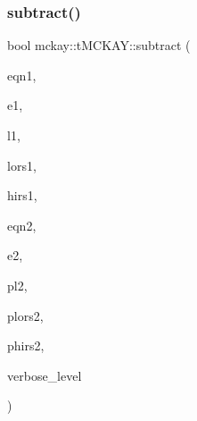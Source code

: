 \mbox{\label{classmckay_1_1t_m_c_k_a_y_a7a9ce2b4e5e116ea813350c4d079ac0f}} 
\subsubsection{\texorpdfstring{subtract()}{subtract()}}
{\footnotesize\ttfamily bool mckay\+::t\+M\+C\+K\+A\+Y\+::subtract (\begin{DoxyParamCaption}\item[{\mbox{\hyperlink{galois_8h_a09fddde158a3a20bd2dcadb609de11dc}{I\+NT}}}]{eqn1,  }\item[{\mbox{\hyperlink{namespacemckay_a4f7cb66ed07fe573b2b08e73ab462c1a}{equation}} \&}]{e1,  }\item[{int}]{l1,  }\item[{int}]{lors1,  }\item[{int}]{hirs1,  }\item[{\mbox{\hyperlink{galois_8h_a09fddde158a3a20bd2dcadb609de11dc}{I\+NT}}}]{eqn2,  }\item[{\mbox{\hyperlink{namespacemckay_a4f7cb66ed07fe573b2b08e73ab462c1a}{equation}} \&}]{e2,  }\item[{int $\ast$}]{pl2,  }\item[{int $\ast$}]{plors2,  }\item[{int $\ast$}]{phirs2,  }\item[{\mbox{\hyperlink{galois_8h_a09fddde158a3a20bd2dcadb609de11dc}{I\+NT}}}]{verbose\+\_\+level }\end{DoxyParamCaption})\hspace{0.3cm}{\ttfamily [protected]}}

\mbox{\label{classmckay_1_1t_m_c_k_a_y_a0828f082ab8a01478033caf5e9beea92}} 
